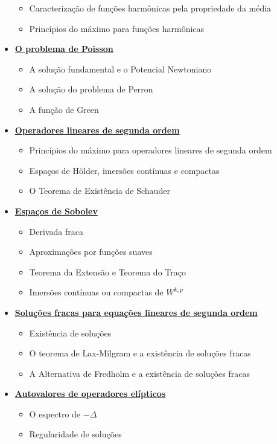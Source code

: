 \begin{itemize}
  \begin{itemize}
    \item Caracterização de funções harmônicas pela propriedade da média
    \item Princípios do máximo para funções harmônicas
  \end{itemize}
  \newpage
  \item \underline{\textbf{ O problema de Poisson}}
  \begin{itemize}
    \item A solução fundamental e o Potencial Newtoniano
    \item A solução do problema de Perron
    \item A função de Green
  \end{itemize}
  \item \underline{\textbf{ Operadores lineares de segunda ordem}}
  \begin{itemize}
    \item Princípios do máximo para operadores lineares de segunda ordem
    \item Espaços de Hölder, imersões contínuas e compactas
    \item O Teorema de Existência de Schauder
  \end{itemize}
  
  \item \underline{\textbf{ Espaços de Sobolev}}
  \begin{itemize}
    \item Derivada fraca
    \item Aproximações por funções suaves
    \item Teorema da Extensão e Teorema do Traço
    \item Imersões contínuas ou compactas de $W^{k,p}$
  \end{itemize}
  \item \underline{\textbf{Soluções fracas para equações lineares de segunda ordem}}
  \begin{itemize}
    \item Existência de soluções
    \item O teorema de Lax-Milgram e a existência de soluções fracas
    \item A Alternativa de Fredholm e a existência de soluções fracas
  \end{itemize}
  \item \underline{\textbf{Autovalores de operadores elípticos}}
  \begin{itemize}
    \item O espectro de $-\Delta$
    \item Regularidade de soluções
  \end{itemize}
\end{itemize}



